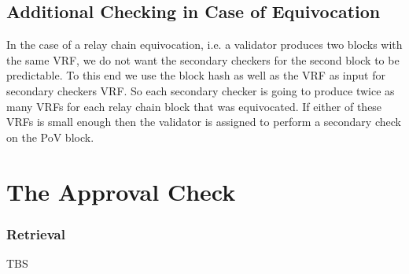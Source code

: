 \subsection{Additional Checking in Case of Equivocation}\label{sect-equivocation-case}
In the case of a relay chain equivocation, i.e. a validator produces two blocks with the same VRF, we do not want the secondary checkers for the second block to be predictable. To this end we use the block hash as well as the VRF as input for secondary checkers VRF. So each secondary checker is going to produce twice as many VRFs for each relay chain block that was equivocated. If either of these VRFs is small enough then the validator is assigned to perform a secondary check on the PoV block.

\section{The Approval Check}
\label{sect-approval-checking}
\subsubsection{Retrieval}
\label{sect-retrieval-of-erasure-pieces}
TBS




